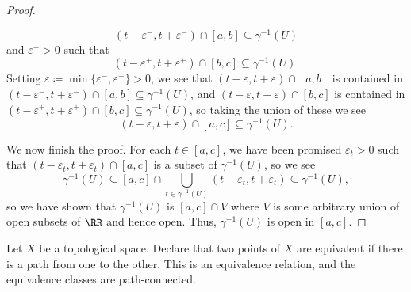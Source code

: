 \documentclass[../notes.tex]{subfiles}
\begin{document}
\begin{proof}
\begin{itemize}
		\[(t-\varepsilon^-,t+\varepsilon^-)\cap[a,b]\subseteq\gamma^{-1}(U)\]
		and $\varepsilon^+>0$ such that
		\[(t-\varepsilon^+,t+\varepsilon^+)\cap[b,c]\subseteq\gamma^{-1}(U).\]
		Setting $\varepsilon\coloneqq\min\{\varepsilon^-,\varepsilon^+\}>0$, we see that $(t-\varepsilon,t+\varepsilon)\cap[a,b]$ is contained in $(t-\varepsilon^-,t+\varepsilon^-)\cap[a,b]\subseteq\gamma^{-1}(U)$, and $(t-\varepsilon,t+\varepsilon)\cap[b,c]$ is contained in $(t-\varepsilon^+,t+\varepsilon^+)\cap[b,c]\subseteq\gamma^{-1}(U)$, so taking the union of these we see
		\[(t-\varepsilon,t+\varepsilon)\cap[a,c]\subseteq\gamma^{-1}(U).\]
	\end{itemize}
	We now finish the proof. For each $t\in[a,c]$, we have been promised $\varepsilon_t>0$ such that $(t-\varepsilon_t,t+\varepsilon_t)\cap[a,c]$ is a subset of $\gamma^{-1}(U)$, so we see
	\[\gamma^{-1}(U)\subseteq[a,c]\cap\bigcup_{t\in\gamma^{-1}(U)}(t-\varepsilon_t,t+\varepsilon_t)\subseteq\gamma^{-1}(U),\]
	so we have shown that $\gamma^{-1}(U)$ is $[a,c]\cap V$ where $V$ is some arbitrary union of open subsets of $\RR$ and hence open. Thus, $\gamma^{-1}(U)$ is open in $[a,c]$.
\end{proof}
\begin{lemma} \label{lem:path-conn-comp}
	Let $X$ be a topological space. Declare that two points of $X$ are equivalent if there is a path from one to the other. This is an equivalence relation, and the equivalence classes are path-connected.
\end{lemma}
\end{document}

